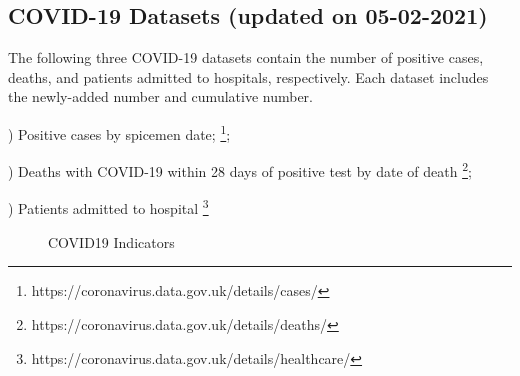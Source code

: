 \documentclass[12pt, a4paper]{report}
\begin{document}
\subsection{COVID-19 Datasets (updated on 05-02-2021)}
The following three COVID-19 datasets contain the number of positive cases, deaths, and patients admitted to hospitals, 
respectively. Each dataset includes the newly-added number and cumulative number.\par
{}) Positive cases by spicemen date;
\footnote[1]{https://coronavirus.data.gov.uk/details/cases/};\par
{}) Deaths with COVID-19 within 28 days of positive test by date of death
\footnote[2]{https://coronavirus.data.gov.uk/details/deaths/};\par
{}) Patients admitted to hospital
\footnote[3]{https://coronavirus.data.gov.uk/details/healthcare/}\par
\begin{figure}[H]
\centering
    \caption{COVID19 Indicators}
    \label{Fig.main}
\end{figure}
\end{document}
